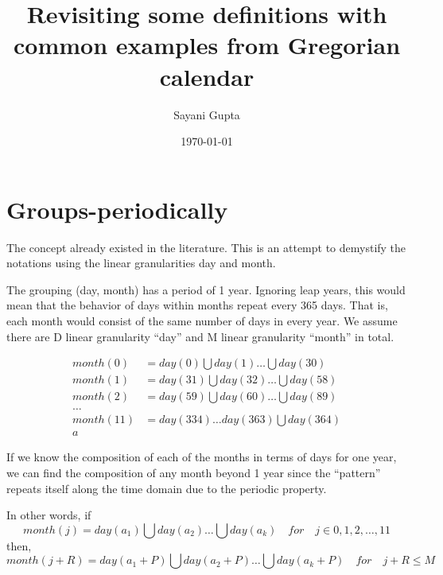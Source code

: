 \documentclass[10pt,a4paper,]{article}
\title{Revisiting some definitions with common examples from Gregorian calendar}
\author{Sayani Gupta}
\date{\today}
\newenvironment{fminipage}%
{\begin{Sbox}\begin{minipage}{\textwidth}}%
{\end{minipage}\end{Sbox}\colorbox[gray]{0.8}{\TheSbox}}
\begin{document}
\vspace*{-2cm}
\begin{fminipage}\sffamily
\maketitle
\end{fminipage}\vspace*{0.5cm}


\hypertarget{groups-periodically}{%
\section{Groups-periodically}\label{groups-periodically}}

The concept already existed in the literature. This is an attempt to demystify the notations using the linear granularities day and month.

The grouping (day, month) has a period of 1 year. Ignoring leap years, this would mean that the behavior of days within months repeat every 365 days. That is, each month would consist of the same number of days in every year. We assume there are D linear granularity \enquote{day} and M linear granularity \enquote{month} in total.

\begin{equation}\label{eq:eq1}
\begin{split}
month(0) & = day(0)\bigcup day(1)\dots\bigcup day(30)\\
month(1) & = day(31)\bigcup day(32)\dots\bigcup day(58)\\
month(2) & = day(59)\bigcup day(60)\dots\bigcup day(89)\\
\dots\\
month(11) & = day(334)\dots day(363)\bigcup day(364)\\a
\end{split}
\end{equation}

If we know the composition of each of the months in terms of days for one year, we can find the composition of any month beyond 1 year since the \enquote{pattern} repeats itself along the time domain due to the periodic property.

In other words, if
\begin{equation}\label{eq:eq2}
month(j) = day(a_1)\bigcup day(a_2)\dots\bigcup day(a_k) \quad for \quad j \in {0,1, 2, \dots, 11}
\end{equation}
then,\\
\begin{equation}
month(j + R) = day(a_1 + P)\bigcup day(a_2 + P)\dots\bigcup day(a_k + P) \quad for \quad j + R \leq M
\end{equation}
\end{document}
